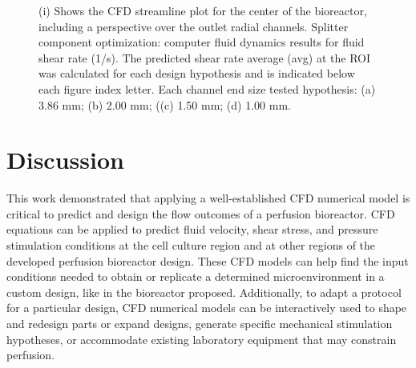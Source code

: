 \begin{figure}
\caption{(i) Shows the \ac{CFD} streamline plot for the center of the bioreactor, including a perspective over the outlet radial channels. Splitter component optimization: computer fluid dynamics results for fluid shear rate (1/s). The predicted shear rate average (avg) at the \ac{ROI} was calculated for each design hypothesis and is indicated below each figure index letter. Each channel end size tested hypothesis: (a) 3.86 \si{\milli\meter}; (b) 2.00 \si{\milli\meter}; ((c) 1.50 \si{\milli\meter}; (d) 1.00 \si{\milli\meter}.}
\label{figSplitter}
\end{figure} 




\section{Discussion}
This work demonstrated that applying a well-established \ac{CFD} numerical model is critical to predict and design the flow outcomes of a perfusion bioreactor. \ac{CFD} equations can be applied to predict fluid velocity, shear stress, and pressure stimulation conditions at the cell culture region and at other regions of the developed perfusion bioreactor design. These \ac{CFD} models can help find the input conditions needed to obtain or replicate a determined microenvironment in a custom design, like in the bioreactor proposed. Additionally, to adapt a protocol for a particular design, \ac{CFD} numerical models can be interactively used to shape and redesign parts or expand designs, generate specific mechanical stimulation hypotheses, or accommodate existing laboratory equipment that may constrain perfusion.  

